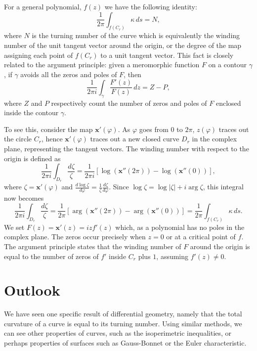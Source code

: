\documentclass{article}
\begin{document}
For a general polynomial, \(f(z)\) we have the following identity:
\[ \frac{1}{2\pi}\int_{f(C_r)} \kappa\,ds = N, \]
where \(N\) is the turning number of the curve which is equivalently the winding number of the unit tangent vector around the origin, or the degree of the map assigning each point of \(f(C_r)\) to a unit tangent vector. This fact is closely related to the argument principle: given a meromorphic function \(F\) on a contour \(\gamma\), if \(\gamma\) avoids all the zeros and poles of \(F\), then
\[ \frac{1}{2\pi i}\int_{\gamma} \frac{F'(z)}{F(z)}\,dz = Z - P, \]
where \(Z\) and \(P\) respectively count the number of zeros and poles of \(F\) enclosed inside the contour \(\gamma\). 

To see this, consider the map \(\mathbf{x}'(\varphi)\). As \(\varphi\) goes from \(0\) to \(2\pi\), \(z(\varphi)\) traces out the circle \(C_r\), hence \(\mathbf{x}'(\varphi)\) traces out a new closed curve \(D_r\) in the complex plane, representing the tangent vectors. The winding number with respect to the origin is defined as
\[ \frac{1}{2\pi i}\int_{D_r} \frac{d\zeta}{\zeta} = \frac{1}{2\pi i}[\log(\mathbf{x}''(2\pi)) - \log(\mathbf{x}''(0))], \]
where \(\zeta = \mathbf{x}'(\varphi)\) and \(\frac{d\log\zeta}{d\varphi} = \frac{1}{\zeta}\frac{d\zeta}{d\varphi}\). Since \(\log\zeta = \log|\zeta| + i\arg\zeta\), this integral now becomes
\[ \frac{1}{2\pi i}\int_{D_r} \frac{d\zeta}{\zeta} = \frac{1}{2\pi}[\arg(\mathbf{x}''(2\pi)) - \arg(\mathbf{x}''(0))] = \frac{1}{2\pi}\int_{f(C_r)} \kappa\,ds. \]
We set \(F(z) = \mathbf{x}'(z) = izf'(z)\) which, as a polynomial has no poles in the complex plane. The zeros occur precisely when \(z = 0\) or at a critical point of \(f\). The argument principle states that the winding number of \(F\) around the origin is equal to the number of zeros of \(f'\) inside \(C_r\) plus \(1\), assuming \(f'(z) \neq 0\).

\section{Outlook}

We have seen one specific result of differential geometry, namely that the total curvature of a curve is equal to its turning number. Using similar methods, we can see other properties of curves, such as the isoperimetric inequalities, or perhaps properties of surfaces such as Gauss-Bonnet or the Euler characteristic.
\end{document}
